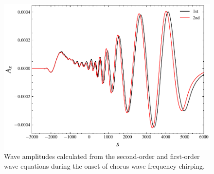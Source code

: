 \documentclass[times,12pt,3p,longtitle]{elsarticle}
\begin{document}
\begin{figure}[htbp]
    \centering
    \includegraphics[scale=0.5]{fig_diff.pdf}
    \caption{ Wave amplitudes calculated from the second-order and first-order wave equations during the onset of chorus wave frequency chirping. 
    }
    \label{fig.cmp2}
\end{figure}
%
\end{document}
